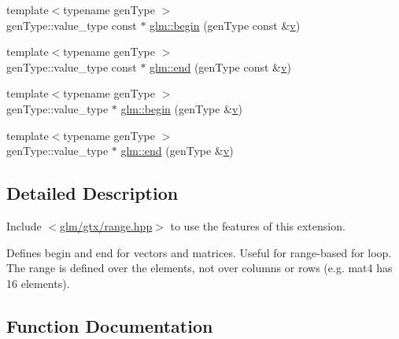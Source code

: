 \begin{DoxyCompactItemize}
\item 
{\footnotesize template$<$typename gen\+Type $>$ }\\gen\+Type\+::value\+\_\+type const  $\ast$ \mbox{\hyperlink{group__gtx__range_gaadcca0cd1ffc54deb39e983bfdcbcdd2}{glm\+::begin}} (gen\+Type const \&\mbox{\hyperlink{_s_d_l__opengl_8h_a10a82eabcb59d2fcd74acee063775f90}{v}})
\item 
{\footnotesize template$<$typename gen\+Type $>$ }\\gen\+Type\+::value\+\_\+type const  $\ast$ \mbox{\hyperlink{group__gtx__range_ga785aa0c9cf7d925318863f950eb81618}{glm\+::end}} (gen\+Type const \&\mbox{\hyperlink{_s_d_l__opengl_8h_a10a82eabcb59d2fcd74acee063775f90}{v}})
\item 
{\footnotesize template$<$typename gen\+Type $>$ }\\gen\+Type\+::value\+\_\+type $\ast$ \mbox{\hyperlink{group__gtx__range_gacc3851df89b9238430e39525c3518ced}{glm\+::begin}} (gen\+Type \&\mbox{\hyperlink{_s_d_l__opengl_8h_a10a82eabcb59d2fcd74acee063775f90}{v}})
\item 
{\footnotesize template$<$typename gen\+Type $>$ }\\gen\+Type\+::value\+\_\+type $\ast$ \mbox{\hyperlink{group__gtx__range_ga0c303e8c522b139252646a93d5e490d4}{glm\+::end}} (gen\+Type \&\mbox{\hyperlink{_s_d_l__opengl_8h_a10a82eabcb59d2fcd74acee063775f90}{v}})
\end{DoxyCompactItemize}


\subsection{Detailed Description}
Include $<$\mbox{\hyperlink{range_8hpp}{glm/gtx/range.\+hpp}}$>$ to use the features of this extension.

Defines begin and end for vectors and matrices. Useful for range-\/based for loop. The range is defined over the elements, not over columns or rows (e.\+g. mat4 has 16 elements). 

\subsection{Function Documentation}
\mbox{\label{group__gtx__range_gaadcca0cd1ffc54deb39e983bfdcbcdd2}} 
